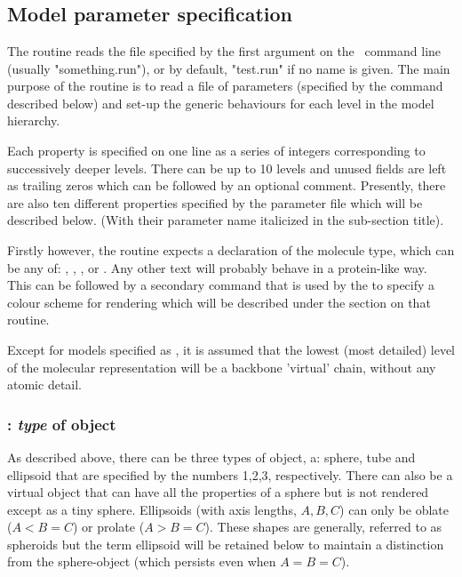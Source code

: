 \section{}

\subsection{Model parameter specification}

The  routine reads the file specified by the first argument on the \NAME\ command
line (usually "something.run"), or by default, "test.run" if no name is given.  The main
purpose of the  routine is to read a file of parameters (specified by the
 command described below) and set-up the generic behaviours for each level in
the model hierarchy.

Each property is specified
on one line as a series of integers corresponding to successively deeper levels.  There
can be up to 10 levels and unused fields are left as trailing zeros which can be followed
by an optional comment.   Presently, there are also ten different properties specified
by the parameter file which will be described below.  (With their parameter name italicized
in the sub-section title).

Firstly however, the routine expects a
declaration of the molecule type, which can be any of: , , ,
 or .  Any other text will probably behave in a protein-like way.
This can be followed by a secondary command that is used by the  to specify
a colour scheme for rendering which will be described under the section on that routine.

Except for models specified as , 
it is assumed that the lowest (most detailed) level of the molecular representation will
be a backbone 'virtual' chain, without any atomic detail.  

\subsubsection{: {\em type} of object}

As described above, there can be three types of object, a: sphere, tube and ellipsoid that
are specified by the numbers 1,2,3, respectively.   There can also be a virtual object that
can have all the properties of a sphere but is not rendered except as a tiny sphere.
Ellipsoids (with axis lengths, $A,B,C$) can only be oblate ($A<B=C$) or prolate ($A>B=C$).
These shapes are generally, referred to as spheroids but the term ellipsoid will be retained
below to maintain a distinction from the sphere-object (which persists even when $A=B=C$).

